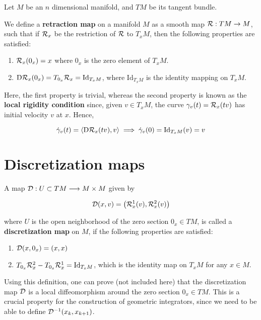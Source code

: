 Let $M$ be an $n$ dimensional manifold, and $TM$ be its tangent bundle.

\begin{defn}\label{defn:retraction}
We define a \textbf{retraction map} on a manifold $M$ as a smooth map $\mathcal{R}: TM \to M$, such that if $\mathcal{R}_x$ be the restriction of $\mathcal{R}$ to $T_x M$, then the following properties are satisfied:

    \begin{enumerate}
        \item $\mathcal{R}_x (0_x) = x$ where $0_x$ is the zero element of $T_x M$.
        \item $\text{D}\mathcal{R}_x (0_x ) = T_{0_x} \mathcal{R}_x = \text{Id}_{T_x M} $, where $\text{Id}_{T_x M}$ is the identity mapping on $T_x M$.
    \end{enumerate}
\end{defn}

Here, the first property is trivial, whereas the second property is known as the \textbf{local rigidity condition} since, given $v \in T_x M$, the curve $\gamma_v(t) = \mathcal{R}_x(tv)$ has initial velocity $v$ at $x$. Hence,

\[
  \dot{\gamma}_v (t) = \langle \text{D}\mathcal{R}_x (tv) , v \rangle \implies \dot{\gamma}_v (0) = \text{Id}_{T_x M}(v) = v
\]

\section{Discretization maps}

\begin{defn}
A map $\mathcal{D} : U \subset TM \longrightarrow M \times M$ given by 

\[
  \mathcal{D} (x,v) = \left( \mathcal{R}^1_x(v), \mathcal{R}^2_x(v) \right)
\]

where $U$ is the open neighborhood of the zero section $0_x \in TM$, is called a \textbf{discretization map} on $M$, if the following properties are satisfied:

\begin{enumerate}
  \item $\mathcal{D}(x,0_x) = (x,x)$ 
  \item $T_{0_x}\mathcal{R}_x^2 - T_{0_x}\mathcal{R}_x^1 = \text{Id}_{T_x M}$, which is the identity map on $T_x M$ for any $x \in M$.
\end{enumerate}
\end{defn}

Using this definition, one can prove (not included here) that the discretization map $\mathcal{D}$ is a local diffeomorphism around the zero section $0_x \in TM$. This is a crucial property for the construction of geometric integrators, since we need to be able to define $\mathcal{D}^{-1} (x_k, x_{k+1})$.

